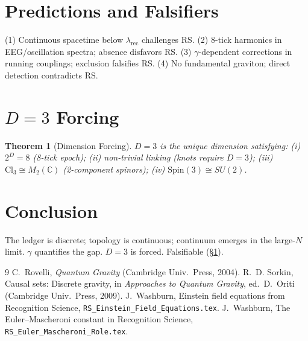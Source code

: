 \documentclass[12pt,a4paper]{article}
\newtheorem{theorem}{Theorem}[section]
\theoremstyle{definition}
\theoremstyle{remark}
\begin{document}
\section{Predictions and Falsifiers}
\label{sec:falsifiers}

(1) Continuous spacetime below $\lambda_{\mathrm{rec}}$ challenges RS.
(2) 8-tick harmonics in EEG/oscillation spectra; absence disfavors RS.
(3) $\gamma$-dependent corrections in running couplings; exclusion
falsifies RS.  (4) No fundamental graviton; direct detection
contradicts RS.

\section{$D = 3$ Forcing}
\label{sec:d3}

\begin{theorem}[Dimension Forcing]
$D = 3$ is the unique dimension satisfying: (i) $2^D = 8$ (8-tick
epoch); (ii) non-trivial linking (knots require $D = 3$); (iii)
$\mathrm{Cl}_3 \cong M_2(\mathbb{C})$ (2-component spinors); (iv)
$\mathrm{Spin}(3) \cong SU(2)$.
\end{theorem}

\section{Conclusion}
\label{sec:conclusion}

The ledger is discrete; topology is continuous; continuum emerges in
the large-$N$ limit.  $\gamma$ quantifies the gap.  $D = 3$ is forced.
Falsifiable (\S\ref{sec:falsifiers}).

\begin{thebibliography}{9}
 C.~Rovelli, \emph{Quantum Gravity} (Cambridge Univ.\ Press, 2004).
 R.~D. Sorkin, Causal sets: Discrete gravity, in \emph{Approaches to Quantum Gravity}, ed.\ D.~Oriti (Cambridge Univ.\ Press, 2009).
 J.~Washburn, Einstein field equations from Recognition Science, \texttt{RS\_Einstein\_Field\_Equations.tex}.
 J.~Washburn, The Euler--Mascheroni constant in Recognition Science, \texttt{RS\_Euler\_Mascheroni\_Role.tex}.
\end{thebibliography}
\end{document}
